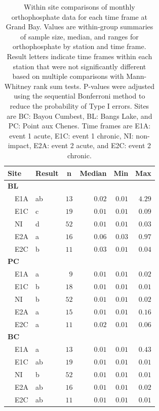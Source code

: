 \documentclass[letterpaper,12pt]{article}\usepackage[]{graphicx}\usepackage[]{color}
\begin{document}
\begin{table}[!tbp]
\caption{Within site comparisons  of monthly orthophosphate data for each time frame at Grand Bay.  Values are within-group summaries of sample size, median, and ranges for orthophosphate by station and time frame.  Result letters indicate time frames within each station that were not significantly different based on multiple comparisons with Mann-Whitney rank sum tests.  P-values were adjusted using the sequential Bonferroni method to reduce the probability of Type I errors. Sites are BC: Bayou Cumbest, BL: Bangs Lake, and PC: Point aux Chenes.  Time frames are E1A: event 1 acute, E1C: event 1 chronic, NI: non-impact, E2A: event 2 acute, and E2C: event 2 chronic.\label{tab:orthtab1}} 
\begin{center}
\begin{tabular}{llrrrr}
\hline\hline
\multicolumn{1}{l}{Site}&\multicolumn{1}{c}{Result}&\multicolumn{1}{c}{n}&\multicolumn{1}{c}{Median}&\multicolumn{1}{c}{Min}&\multicolumn{1}{c}{Max}\tabularnewline
\hline
{\bfseries BL}&&&&&\tabularnewline
~~E1A&ab&$13$&$0.02$&$0.01$&$4.29$\tabularnewline
~~E1C&c&$19$&$0.01$&$0.01$&$0.09$\tabularnewline
~~NI&d&$52$&$0.01$&$0.01$&$0.03$\tabularnewline
~~E2A&a&$16$&$0.06$&$0.03$&$0.97$\tabularnewline
~~E2C&b&$11$&$0.03$&$0.01$&$0.04$\tabularnewline
\hline
{\bfseries PC}&&&&&\tabularnewline
~~E1A&a&$ 9$&$0.01$&$0.01$&$0.02$\tabularnewline
~~E1C&b&$18$&$0.01$&$0.01$&$0.01$\tabularnewline
~~NI&b&$52$&$0.01$&$0.01$&$0.02$\tabularnewline
~~E2A&a&$15$&$0.01$&$0.01$&$0.16$\tabularnewline
~~E2C&a&$11$&$0.02$&$0.01$&$0.06$\tabularnewline
\hline
{\bfseries BC}&&&&&\tabularnewline
~~E1A&a&$13$&$0.01$&$0.01$&$0.43$\tabularnewline
~~E1C&ab&$19$&$0.01$&$0.01$&$0.01$\tabularnewline
~~NI&b&$52$&$0.01$&$0.01$&$0.01$\tabularnewline
~~E2A&ab&$16$&$0.01$&$0.01$&$0.02$\tabularnewline
~~E2C&ab&$11$&$0.01$&$0.01$&$0.01$\tabularnewline
\hline
\end{tabular}\end{center}

\end{table}

\clearpage
\end{document}
